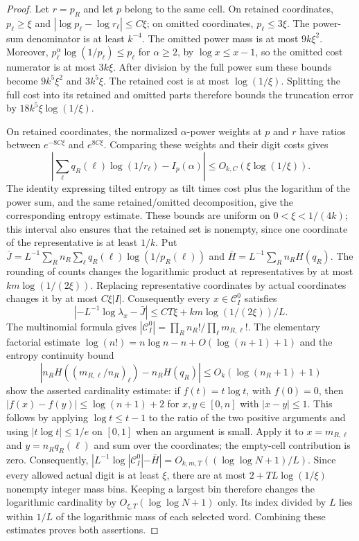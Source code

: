 \documentclass[11pt]{article}
\numberwithin{equation}{section}
\theoremstyle{definition}
\theoremstyle{remark}
\newcommand{\1}{\mathbf 1}
\begin{document}
\begin{proof}
Let $r=p_R$ and let $p$ belong to the same cell. On retained coordinates,
$p_\ell\ge\xi$ and $|\log p_\ell-\log r_\ell|\le C\xi$; on omitted
coordinates, $p_\ell\le3\xi$. The power-sum denominator is at least
$k^{-4}$. The omitted power mass is at most $9k\xi^2$. Moreover,
$p_\ell^\alpha\log(1/p_\ell)\le p_\ell$ for $\alpha\ge2$,
by $\log x\le x-1$, so the omitted cost numerator is at most $3k\xi$.
After division by the full power sum these bounds become $9k^5\xi^2$
and $3k^5\xi$. The retained cost is at most $\log(1/\xi)$. Splitting
the full cost into its retained and omitted parts therefore bounds the
truncation error by $18k^5\xi\log(1/\xi)$.

On retained coordinates, the normalized $\alpha$-power weights at $p$
and $r$ have ratios between $e^{-8C\xi}$ and $e^{8C\xi}$. Comparing
these weights and their digit costs gives
\[
 \left|\sum_\ell q_R(\ell)\log(1/r_\ell)-I_p(\alpha)\right|
 \le O_{k,C}(\xi\log(1/\xi)).
\]
The identity expressing tilted entropy as tilt times cost plus the
logarithm of the power sum, and the same retained/omitted decomposition,
give the corresponding entropy estimate. These bounds are uniform on
$0<\xi<1/(4k)$; this interval also ensures that the retained set is
nonempty, since one coordinate of the representative is at least $1/k$.
Put $\bar J=L^{-1}\sum_R n_R\sum_\ell q_R(\ell)\log(1/p_R(\ell))$
and $\bar H=L^{-1}\sum_R n_RH(q_R)$.
The rounding of counts changes the logarithmic product at representatives
by at most $km\log(1/(2\xi))$.
Replacing representative coordinates by actual coordinates changes it by
at most $C\xi|I|$.  Consequently every $x\in\mathcal C^0_I$ satisfies
\[
 |{-L^{-1}\log\lambda_x}-\bar J|
 \le CT\xi+km\log(1/(2\xi))/L.
\]
The multinomial formula gives
$|\mathcal C^0_I|=\prod_Rn_R!/\prod_\ell m_{R,\ell}!$.
The elementary factorial estimate
$\log(n!)=n\log n-n+O(\log(n+1)+1)$ and the entropy continuity bound
\[
 |n_RH((m_{R,\ell}/n_R)_\ell)-n_RH(q_R)|
 \le O_k(\log(n_R+1)+1)
\]
show the asserted cardinality estimate: if $f(t)=t\log t$, with $f(0)=0$,
then $|f(x)-f(y)|\le\log(n+1)+2$ for $x,y\in[0,n]$ with
$|x-y|\le1$. This follows by applying $\log t\le t-1$ to the ratio of the two positive arguments and using $|t\log t|\le1/e$ on $[0,1]$ when an argument is small. Apply it to
$x=m_{R,\ell}$ and $y=n_Rq_R(\ell)$ and sum over the coordinates;
the empty-cell contribution is zero. Consequently,
$|L^{-1}\log|\mathcal C^0_I|-\bar H|
 =O_{k,m,T}((\log\log N+1)/L)$.
Since every allowed actual digit is at least $\xi$, there are at most
$2+TL\log(1/\xi)$ nonempty integer mass bins.
Keeping a largest bin therefore changes the logarithmic cardinality by
$O_{\xi,T}(\log\log N+1)$ only.  Its index divided by $L$ lies within
$1/L$ of the logarithmic mass of each selected word.
Combining these estimates proves both assertions.
\end{proof}
\end{document}

